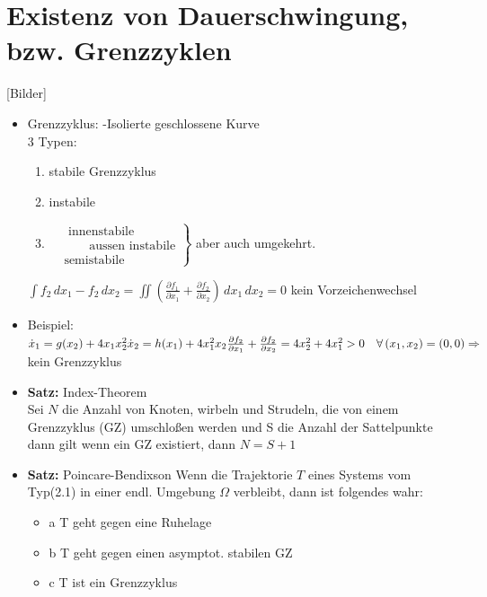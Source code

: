 \documentclass[ngerman]{tudscrreprt}
\begin{document}
\section{Existenz von Dauerschwingung, bzw. Grenzzyklen}
[Bilder]
\begin{itemize}
\item Grenzzyklus: \hspace{1cm}-Isolierte geschlossene Kurve
\\3 Typen:
\begin{enumerate}
\item stabile Grenzzyklus
\item instabile
\item 
$\left.
\begin{matrix}
&\text{~innenstabile}\\
&\text{~~~~~~aussen instabile}\\
&\text{semistabile}
\end{matrix}
\right\}$
aber auch umgekehrt.
\end{enumerate}
$ 
\int f_2 \, dx_1 - f_2\,dx_2 = \iint( \frac{\partial f_1}{\partial x_1} + \frac{\partial f_2}{\partial x_2})\, dx_1\, dx_2 = 0 
$
kein Vorzeichenwechsel
\item Beispiel:\\
$ 
\dot x_1 = g(x_2) + 4x_1x_2^2\\
\dot x_2 = h(x_1) + 4x_1^2x_2\\
\\
\frac{\partial f_2}{\partial x_1} + \frac{\partial f_2}{\partial x_2} = 4 x_2^2 + 4x_1^2 >0 \quad \forall \, (x_1, x_2) = (0,0)\Rightarrow 
$ 
kein Grenzzyklus\\
\item \textbf{Satz:} Index-Theorem\\
Sei $N$ die Anzahl von Knoten, wirbeln und Strudeln, die von einem Grenzzyklus (GZ) umschloßen werden und S die Anzahl der Sattelpunkte dann gilt wenn ein GZ existiert, dann $N=S+1$
\item \textbf{Satz:} Poincare-Bendixson\newline
Wenn die Trajektorie $T$ eines Systems vom Typ(2.1) in einer endl. Umgebung $\Omega$ verbleibt, dann ist folgendes wahr: 
\begin{itemize}
\item {a} T geht gegen eine Ruhelage
\item {b} T geht gegen einen asymptot. stabilen GZ
\item {c} T ist ein Grenzzyklus 
\end{itemize}

\end{itemize}
\end{document}
